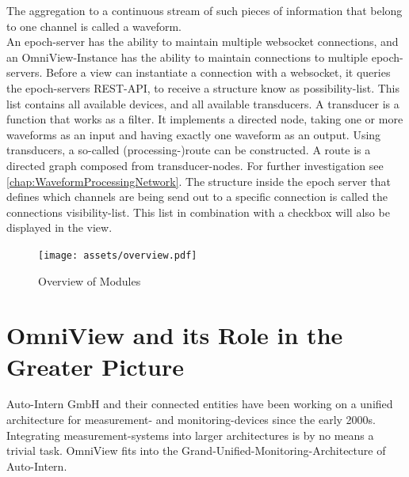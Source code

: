 \documentclass{scrreprt}
\begin{document}
The aggregation to a continuous stream of such pieces of information that belong to one channel is called a waveform. 
\\
An epoch-server has the ability to maintain multiple websocket connections, and an OmniView-Instance has the ability to maintain connections to multiple epoch-servers. 
Before a view can instantiate a connection with a websocket, it queries the epoch-servers REST-API, to receive a structure know as possibility-list.
This list contains all available devices, and all available transducers. 
A transducer is a function that works as a filter.
It implements a directed node, taking one or more waveforms as an input and having exactly one waveform as an output. 
Using transducers, a so-called (processing-)route can be constructed. 
A route is a directed graph composed from transducer-nodes. 
For further investigation see \ref{chap:WaveformProcessingNetwork}.
The structure inside the epoch server that defines which channels are being send out to a specific connection is called the connections visibility-list. 
This list in combination with a checkbox will also be displayed in the view.

\begin{figure}
    \texttt{[image: assets/overview.pdf]}
    \caption{Overview of Modules}
\end{figure}

\section[Greater Picture]{OmniView and its Role in the Greater Picture}
Auto-Intern GmbH and their connected entities have been working on a unified architecture for measurement- and monitoring-devices since the early 2000s. 
Integrating measurement-systems into larger architectures is by no means a trivial task.
OmniView fits into the Grand-Unified-Monitoring-Architecture of Auto-Intern.
\end{document}
